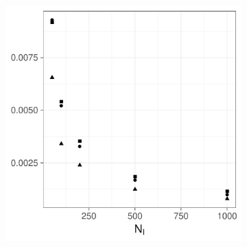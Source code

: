 \begin{figure}[htbp]
\begin{subfigure}[b]{0.49\textwidth}
        \includegraphics[width=\textwidth]{results/by_pop_size/RMISE-vs-population}
        \caption{}
        \label{fig:ise:unifNpop_1h:rmise}
    \end{subfigure}


\end{figure}
